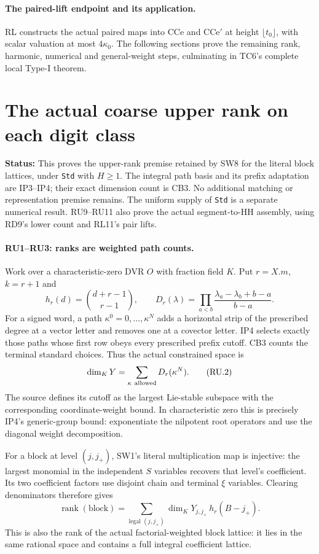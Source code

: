 \documentclass[11pt,a4paper]{article}
\numberwithin{equation}{section}
\theoremstyle{remark}\newtheorem{remark}[theorem]{Remark}
\newcommand{\status}[1]{\textbf{Status:} #1}
\begin{document}
\paragraph{The paired-lift endpoint and its application.}
RL constructs the actual paired maps into $\mathrm{CCe}$ and
$\mathrm{CCe}'$ at height $\lfloor t_0\rfloor$, with scalar
valuation at most $4\kappa_0$. The following sections prove the
remaining rank, harmonic, numerical and general-weight steps,
culminating in TC6's complete local Type-I theorem.

\section{The actual coarse upper rank on each digit class}
\label{sec:rank-upper}

\status{This proves the upper-rank premise retained by SW8 for the
literal block lattices, under \texttt{Std} with $H\ge1$. The integral
path basis and its prefix adaptation are IP3--IP4; their exact dimension
count is CB3. No additional matching or representation premise remains.
The uniform supply of \texttt{Std} is a separate numerical result.
RU9--RU11 also prove the actual segment-to-HH assembly, using RD9's
lower count and RL11's pair lifts.}

\paragraph{RU1--RU3: ranks are weighted path counts.}
Work over a characteristic-zero DVR $O$ with fraction field $K$.
Put $r=X.m$, $k=r+1$ and
\[
 h_r(d)=\binom{d+r-1}{r-1},\qquad
 D_r(\lambda)=\prod_{a<b}
       \frac{\lambda_a-\lambda_b+b-a}{b-a}.                 \tag{RU.1}
\]
For a signed word, a path $\kappa^0=0,\ldots,\kappa^N$ adds a
horizontal strip of the prescribed degree at a vector letter and
removes one at a covector letter. IP4 selects exactly those paths
whose first row obeys every prescribed prefix cutoff. CB3 counts
the terminal standard choices. Thus the actual constrained space is
\[
 \dim_K Y=\sum_{\kappa\ {\rm allowed}}D_r(\kappa^N).
                                                               \tag{RU.2}
\]
The source defines its cutoff as the largest Lie-stable subspace
with the corresponding coordinate-weight bound. In characteristic
zero this is precisely IP4's generic-group bound: exponentiate the
nilpotent root operators and use the diagonal weight decomposition.

For a block at level $(j,j_+)$, SW1's literal multiplication map is
injective: the largest monomial in the independent $S$ variables
recovers that level's coefficient. Its two coefficient factors use
disjoint chain and terminal $\xi$ variables. Clearing denominators
therefore gives
\[
 \operatorname{rank}(\text{block})
   =\sum_{\text{legal }(j,j_+)}
       \dim_KY_{j,j_+}\,h_r(B-j_+).                         \tag{RU.3}
\]
This is also the rank of the actual factorial-weighted block lattice:
it lies in the same rational space and contains a full integral
coefficient lattice.
\end{document}
